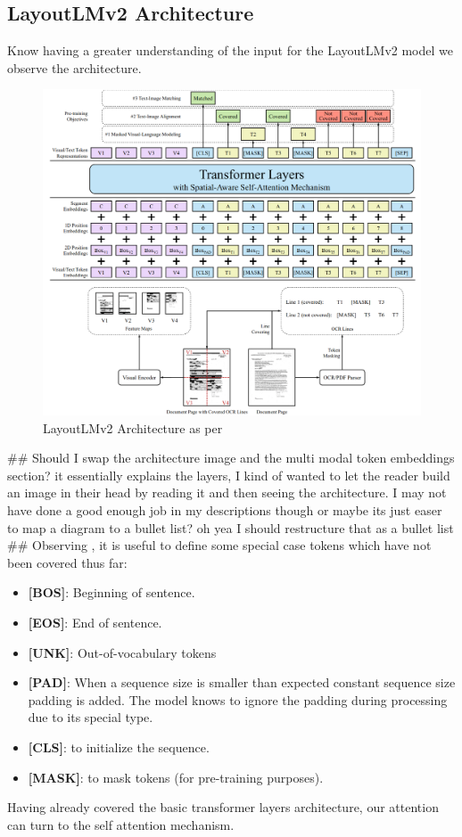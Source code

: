 \subsection{LayoutLMv2 Architecture}
Know having a greater understanding of the input for the LayoutLMv2 model we observe the architecture.
\begin{figure}[H]
	\centering
	\includegraphics[width=1\textwidth]{figures/layoutlmv2_archi.png}
	\caption{LayoutLMv2 Architecture as per~\autocite{xuLayoutLMv2MultimodalPretraining2022}}
	\label{fig:layoutlmv2_archi}
\end{figure}

\#\# Should I swap the architecture image and the multi modal token embeddings section? it essentially explains the 
layers, I kind of wanted to let the reader build an image in their head by reading it and then seeing the architecture. 
I may not have done a good enough job in my descriptions though or maybe its just easer to map a diagram to a bullet list?
oh yea I should restructure that as a bullet list
\#\#
Observing , it is useful to define some special case tokens which have not been covered thus far:
\begin{itemize}
	\item \textbf{[BOS]}: Beginning of sentence.
	\item \textbf{[EOS]}: End of sentence.
	\item \textbf{[UNK]}: Out-of-vocabulary tokens
	\item \textbf{[PAD]}: When a sequence size is smaller than expected constant sequence size padding is added. The model
	      knows to ignore the padding during processing due to its special type.
	\item \textbf{[CLS]}: to initialize the sequence.
	\item \textbf{[MASK]}: to mask tokens (for pre-training purposes).
\end{itemize}
Having already covered the basic transformer layers architecture, our attention can turn to the self attention mechanism.
